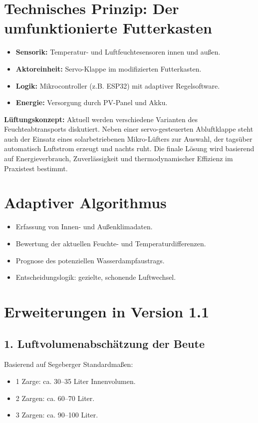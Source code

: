 \documentclass[11pt,a4paper]{article}
\begin{document}
\section{Technisches Prinzip: Der umfunktionierte Futterkasten}
\begin{itemize}[topsep=2pt]
  \item \textbf{Sensorik:} Temperatur- und Luftfeuchtesensoren innen und au\ss{}en.
  \item \textbf{Aktoreinheit:} Servo-Klappe im modifizierten Futterkasten.
  \item \textbf{Logik:} Mikrocontroller (z.B. ESP32) mit adaptiver Regelsoftware.
  \item \textbf{Energie:} Versorgung durch PV-Panel und Akku.
\end{itemize}
\textbf{L\"uftungskonzept:} Aktuell werden verschiedene Varianten des Feuchteabtransports diskutiert. Neben einer servo-gesteuerten Abluftklappe steht auch der Einsatz eines solarbetriebenen Mikro-L\"ufters zur Auswahl, der tags\"uber automatisch Luftstrom erzeugt und nachts ruht. Die finale L\"osung wird basierend auf Energieverbrauch, Zuverl\"assigkeit und thermodynamischer Effizienz im Praxistest bestimmt.

\section{Adaptiver Algorithmus}
\begin{itemize}[topsep=2pt]
  \item Erfassung von Innen- und Au\ss{}enklimadaten.
  \item Bewertung der aktuellen Feuchte- und Temperaturdifferenzen.
  \item Prognose des potenziellen Wasserdampfaustrags.
  \item Entscheidungslogik: gezielte, schonende Luftwechsel.
\end{itemize}

\section{Erweiterungen in Version 1.1}
\subsection{1. Luftvolumenabsch\"atzung der Beute}
Basierend auf Segeberger Standardma\ss{}en:
\begin{itemize}[topsep=2pt]
  \item 1 Zarge: ca. 30--35 Liter Innenvolumen.
  \item 2 Zargen: ca. 60--70 Liter.
  \item 3 Zargen: ca. 90--100 Liter.
\end{itemize}
\end{document}
